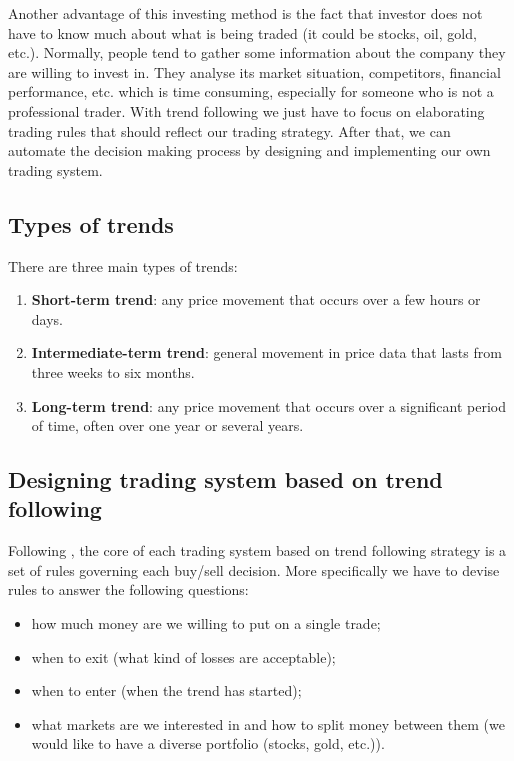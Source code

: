 Another advantage of this investing method is the fact that investor does not have to know much about what is being traded (it could be stocks, oil, gold, etc.).
Normally, people tend to gather some information about the company they are willing to invest in. 
They analyse its market situation, competitors, financial performance, etc. which is time consuming, especially for someone who is not a professional trader.
With trend following we just have to focus on elaborating trading rules that should reflect our trading strategy.
After that, we can automate the decision making process by designing and implementing our own trading system.   

\subsection{Types of trends}
\label{sec:types_of_trends}

There are three main types of trends:

\begin{enumerate}
  \item \textbf{Short-term trend}: any price movement that occurs over a few hours or days.
  \item \textbf{Intermediate-term trend}: general movement in price data that lasts from three weeks to six months.
  \item \textbf{Long-term trend}: any price movement that occurs over a significant period of time, often over one year or several years.
\end{enumerate}



\subsection{Designing trading system based on trend following} 

Following \cite{Trend01}, the core of each trading system based on trend following strategy is a set of rules governing each buy/sell decision.
More specifically we have to devise rules to answer the following questions:

\begin{itemize}
  \item how much money are we willing to put on a single trade;
  \item when to exit (what kind of losses are acceptable);
  \item when to enter (when the trend has started); 
  \item what markets are we interested in and how to split money between them (we would like to have a diverse portfolio (stocks, gold, etc.)).
\end{itemize}

